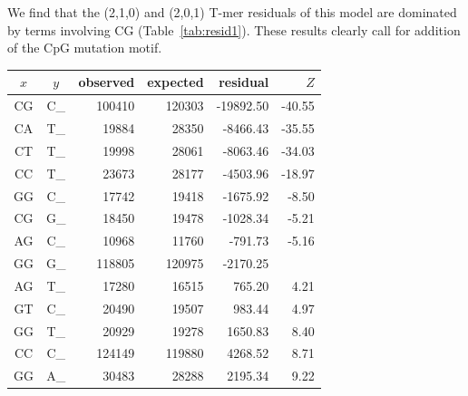 \documentclass{article}
\newcommand{\nA}{\mbox{A}}  %
\newcommand{\nC}{\mbox{C}}
\newcommand{\nG}{\mbox{G}}
\newcommand{\nT}{\mbox{T}}
\theoremstyle{plain}
\theoremstyle{definition}
\begin{document}
We find that the (2,1,0) and (2,0,1) T-mer residuals of this model are dominated by
terms involving CG (Table~\ref{tab:resid1}).
These results clearly call for addition of the CpG mutation motif.

\begin{table}
    \begin{center}
        \begin{tabular}{ccrrrr}
                $x$ & $y$ & observed &   expected &    residual &  $Z$ \\
                \hline
                \nC\nG  & \nC\_   & 100410   &  120303    & -19892.50   &	-40.55  \\
                \nC\nA  & \nT\_   &  19884   &   28350    &  -8466.43   &	-35.55  \\
                \nC\nT  & \nT\_   &  19998   &   28061    &  -8063.46   &	-34.03  \\
                \nC\nC  & \nT\_   &  23673   &   28177    &  -4503.96   &	-18.97  \\
                \nG\nG  & \nC\_   &  17742   &   19418    &  -1675.92   &	 -8.50  \\
                \nC\nG  & \nG\_   &  18450   &   19478    &  -1028.34   &	 -5.21  \\
                \nA\nG  & \nC\_   &  10968   &   11760    &   -791.73   &	 -5.16  \\
                \nG\nG  & \nG\_   & 118805   &  120975    &  -2170.25   &    \\
                \hline
                \nA\nG  & \nT\_   &  17280   &   16515    &    765.20   &  4.21   \\
                \nG\nT  & \nC\_   &  20490   &   19507    &    983.44   &  4.97   \\
                \nG\nG  & \nT\_   &  20929   &   19278    &   1650.83   &  8.40   \\
                \nC\nC  & \nC\_   & 124149   &  119880    &   4268.52   &  8.71   \\
                \nG\nG  & \nA\_   &  30483   &   28288    &   2195.34   &  9.22   \\

\end{tabular}
\end{center}
\end{table}
\end{document}
